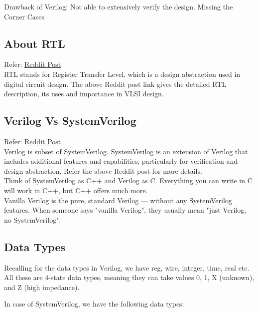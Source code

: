 \documentclass[12pt, a4paper]{article}
\begin{document}
Drawback of Verilog: Not able to extensively verify the design. Missing the Corner Cases

\subsection{About RTL}

Refer: \href{https://www.reddit.com/r/vlsi_enthusiast/comments/1ffoqd4/what_is_rtl_register_transfer_level_design_in_vlsi/}{Reddit Post}\\ 

RTL stands for Register Transfer Level, which is a design abstraction used in digital circuit design. The above Reddit post link gives the detailed RTL description, its uses and importance in VLSI design.

\subsection{Verilog Vs SystemVerilog}

Refer: \href{https://www.reddit.com/r/Verilog/comments/oqkcj5/difference_between_verilog_and_system_verilog/}{Reddit Post}\\ 

Verilog is subset of SystemVerilog. SystemVerilog is an extension of Verilog that includes additional features and capabilities, particularly for verification and design abstraction. Refer the above Reddit post for more details.\\

Think of SystemVerilog as C++ and Verilog as C. Everything you can write in C will work in C++, but C++ offers much more.\\

Vanilla Verilog is the pure, standard Verilog — without any SystemVerilog features. When someone says "vanilla Verilog", they usually mean "just Verilog, no SystemVerilog".


\subsection{Data Types}
Recalling for the data types in Verilog, we have reg, wire, integer, time, real etc. All these are 4-state data types, meaning they can take values 0, 1, X (unknown), and Z (high impedance).

In case of SystemVerilog, we have the following data types:
\end{document}
